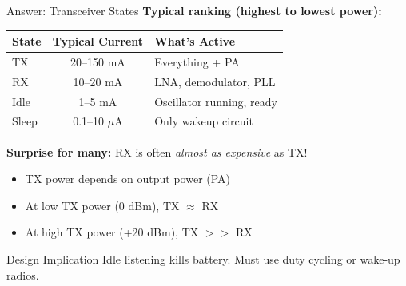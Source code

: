 \documentclass[aspectratio=169,11pt]{beamer}
\begin{document}
\begin{frame}{Answer: Transceiver States}
    \textbf{Typical ranking (highest to lowest power):}
    
    \vspace{0.3cm}
    \begin{table}
        \centering
        \begin{tabular}{@{}lcl@{}}
            \toprule
            \textbf{State} & \textbf{Typical Current} & \textbf{What's Active} \\
            \midrule
            TX & 20--150 mA & Everything + PA \\
            RX & 10--20 mA & LNA, demodulator, PLL \\
            Idle & 1--5 mA & Oscillator running, ready \\
            Sleep & 0.1--10 $\mu$A & Only wakeup circuit \\
            \bottomrule
        \end{tabular}
    \end{table}
    
    \vspace{0.3cm}
    \textbf{Surprise for many:} RX is often \textit{almost as expensive} as TX!
    
    \begin{itemize}
        \item TX power depends on output power (PA)
        \item At low TX power (0 dBm), TX $\approx$ RX
        \item At high TX power (+20 dBm), TX $>>$ RX
    \end{itemize}
    
    \vspace{0.2cm}
    \begin{alertblock}{Design Implication}
        Idle listening kills battery. Must use duty cycling or wake-up radios.
    \end{alertblock}
\end{frame}
\end{document}

